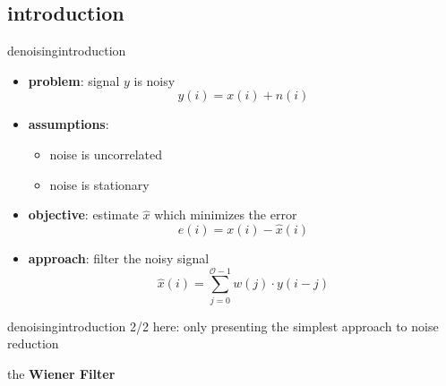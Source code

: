 \subsection{introduction}
	\begin{frame}{denoising}{introduction}
		\begin{itemize}
			\item	\textbf{problem}: signal $y$ is noisy
                \begin{equation*}
                    y(i) = x(i) + n(i)                    
                \end{equation*}
            \pause
            \item   \textbf{assumptions}:
                \begin{itemize}
                    \item   noise is uncorrelated
                    \item   noise is stationary
                \end{itemize}
            \pause
            \smallskip \item   \textbf{objective}: estimate $\hat{x}$ which minimizes the error
                \begin{equation*}
                    e(i)  = x(i) - \hat{x}(i)
                \end{equation*}
            \pause
            \item   \textbf{approach}: filter the noisy signal
                \begin{equation*}
                    \hat{x}(i) = \sum\limits_{j=0}^{\mathcal{O}-1} w(j)\cdot y(i-j)
                \end{equation*}
		\end{itemize}
	\end{frame}
    \begin{frame}{denoising}{introduction 2/2}
        here: only presenting the simplest approach to noise reduction
        
        
        \pause
        \bigskip
        the \textbf{Wiener Filter}
	\end{frame}

